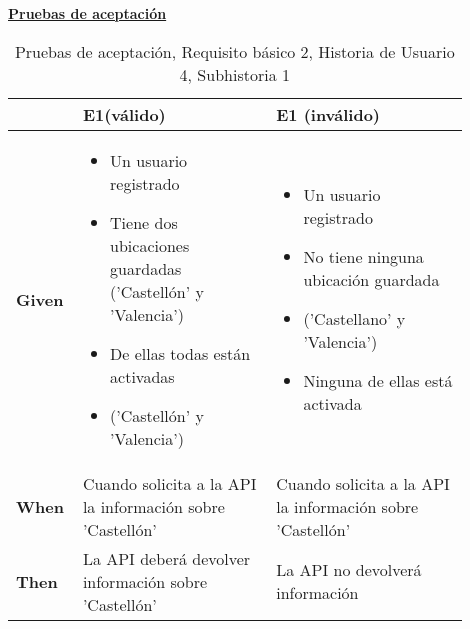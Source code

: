 \documentclass[../ei103948-project-documentation.tex]{subfiles}
\begin{document}
\begin{center}
							\textbf{\underline{Pruebas de aceptación}}
							\begin{table}[H]
								\centering
								\begin{tabular}{|p{0.10\linewidth}|p{0.40\linewidth}|p{0.40\linewidth}|}
									\hline
									\textbf{}      & \textbf{E1(válido)}                                                                                                                             & \textbf{E1 (inválido)}                                                                                                         \\ \hline
									\textbf{Given} &
									\begin{itemize}\vspace{-5mm}\setlength\itemsep{0mm}\setlength\parskip{0mm}\setlength{\itemindent}{-5mm} 
										\item Un usuario registrado
										\item Tiene dos ubicaciones guardadas ('Castellón' y 'Valencia')
										\item De ellas todas están activadas
										\item('Castellón' y 'Valencia')
									\end{itemize}& 
									\begin{itemize}\vspace{-5mm}\setlength\itemsep{0mm}\setlength\parskip{0mm}\setlength{\itemindent}{-5mm}
										\item Un usuario registrado
										\item No tiene ninguna ubicación guardada
										\item ('Castellano' y 'Valencia')
										\item Ninguna de ellas está activada
									\end{itemize}\\ \hline
									\textbf{When}  & Cuando solicita a la API la información sobre 'Castellón'                                                                                       & Cuando solicita a la API la información sobre 'Castellón'                                                                      \\ \hline
									\textbf{Then}  & La API deberá devolver información sobre 'Castellón'                                                                                            & La API no devolverá información                                                                                                \\ \hline
									\end{tabular}
								\caption{Pruebas de aceptación, Requisito básico 2, Historia de Usuario 4, Subhistoria 1}
							\end{table}
							\end{center}
\end{document}
